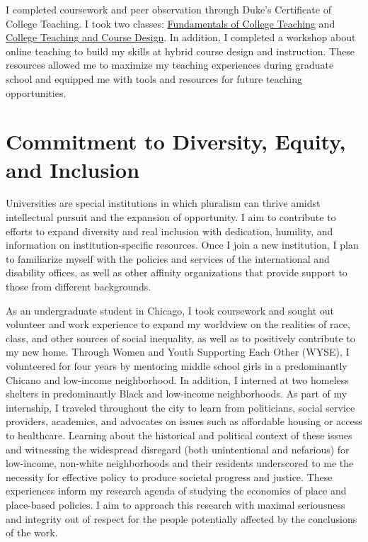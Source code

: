 I completed coursework and peer observation through Duke's Certificate of College Teaching. I took two classes: \href{https://gradschool.duke.edu/professional-development/programs/certificate-college-teaching/coursework-teaching/gs750/}{Fundamentals of College Teaching} and \href{https://gradschool.duke.edu/professional-development/programs/certificate-college-teaching/coursework-teaching/gs755-college/}{College Teaching and Course Design}. In addition, I completed a workshop about online teaching to build my skills at hybrid course design and instruction. These resources allowed me to maximize my teaching experiences during graduate school and equipped me with tools and resources for future teaching opportunities.


\section{Commitment to Diversity, Equity, and Inclusion}


Universities are special institutions in which pluralism can thrive amidst intellectual pursuit and the expansion of opportunity. I aim to contribute to efforts to expand diversity and real inclusion with dedication, humility, and information on institution-specific resources. Once I join a new institution, I plan to familiarize myself with the policies and services of the international and disability offices, as well as other affinity organizations that provide support to those from different backgrounds. 

As an undergraduate student in Chicago, I took coursework and sought out volunteer and work experience to expand my worldview on the realities of race, class, and other sources of social inequality, as well as to positively contribute to my new home. Through Women and Youth Supporting Each Other (WYSE), I volunteered for four years by mentoring middle school girls in a predominantly Chicano and low-income neighborhood. In addition, I interned at two homeless shelters in predominantly Black and low-income neighborhoods. As part of my internship, I traveled throughout the city to learn from politicians, social service providers, academics, and advocates on issues such as affordable housing or access to healthcare. Learning about the historical and political context of these issues and witnessing the widespread disregard (both unintentional and nefarious) for low-income, non-white neighborhoods and their residents underscored to me the necessity for effective policy to produce societal progress and justice. These experiences inform my research agenda of studying the economics of place and place-based policies. I aim to approach this research with maximal seriousness and integrity out of respect for the people potentially affected by the conclusions of the work.


